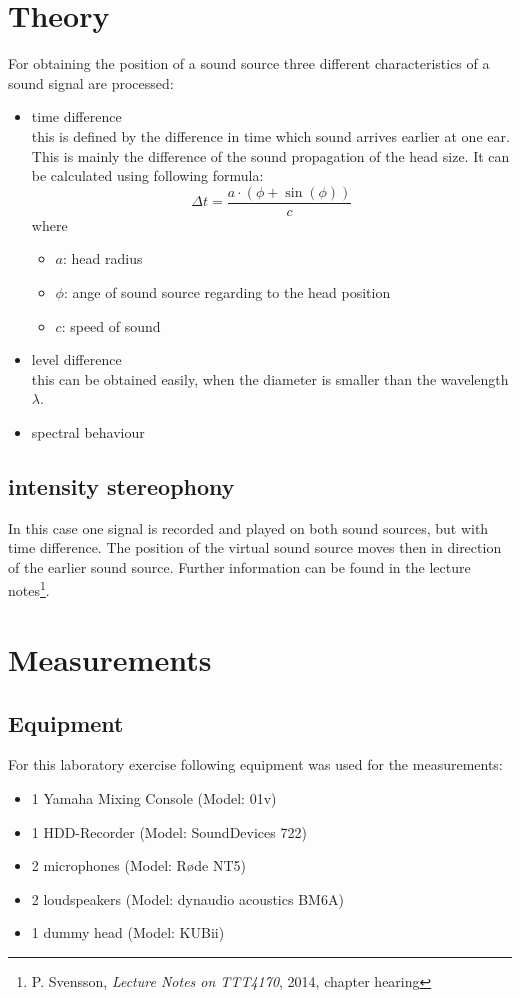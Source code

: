 \documentclass{article}
\begin{document}
\section{Theory}
For obtaining the position of a sound source three different characteristics of a sound signal are processed:
\begin{itemize}
\item time difference\\
this is defined by the difference in time which sound arrives earlier at one ear. This is mainly the difference of the sound propagation of the head size. It can be calculated using following formula:
\begin{equation}
\Delta t=\frac{a\cdot(\phi+\sin(\phi))}{c}
\end{equation}
where
\begin{itemize}
\item $a$: head radius
\item $\phi$: ange of sound source regarding to the head position
\item $c$: speed of sound
\end{itemize}
\item level difference\\
this can be obtained easily, when the diameter is smaller than the wavelength $\lambda$. 
\item spectral behaviour
\end{itemize}
\subsection{intensity stereophony}
In this case one signal is recorded and played on both sound sources, but with time difference. The position of the virtual sound source moves then in direction of the earlier sound source. Further information can be found in the lecture notes\footnote{P. Svensson, \textit{Lecture Notes on TTT4170}, 2014, chapter hearing}.
\section{Measurements}
\subsection{Equipment}
For this laboratory exercise following equipment was used for the measurements:
\begin{itemize}
\item 1 Yamaha Mixing Console (Model: 01v)
\item 1 HDD-Recorder (Model: SoundDevices 722)
\item 2 microphones (Model: Røde NT5)
\item 2 loudspeakers (Model: dynaudio acoustics BM6A)
\item 1 dummy head (Model: KUBii)
\end{itemize}
\end{document}
